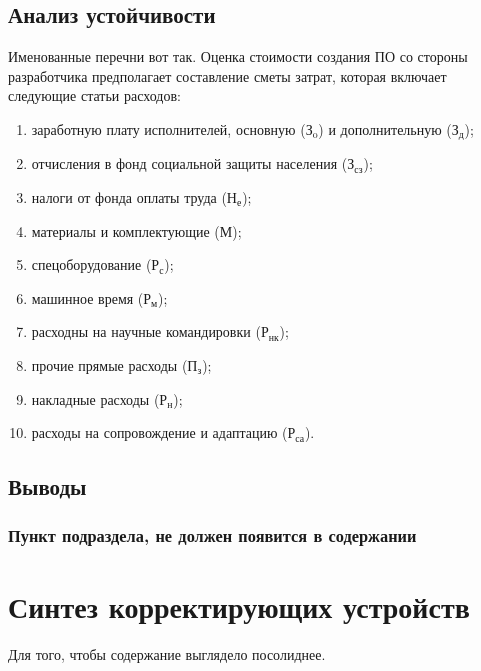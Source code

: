 \subsection{Анализ устойчивости} 
\label{sec:analysys_rob}
Именованные перечни вот так. 
Оценка стоимости создания ПО со стороны разработчика предполагает составление сметы затрат, которая включает следующие статьи расходов:
\begin{enumerate}

  \item заработную плату исполнителей, основную ($ \text{З}_{\text{o}} $) и дополнительную ($\text{З}_{\text{д}} $);

  \item отчисления в фонд социальной защиты населения ($ \text{З}_\text{сз} $);

  \item налоги от фонда оплаты труда ($ \text{Н}_\text{е} $);

  \item материалы и комплектующие ($ \text{М} $);

  \item спецоборудование ($ \text{Р}_\text{с} $);

  \item машинное время ($ \text{Р}_\text{м} $);

  \item расходны на научные командировки ($ \text{Р}_\text{нк} $);

  \item прочие прямые расходы ($ \text{П}_\text{з} $);

  \item накладные расходы ($ \text{Р}_\text{н} $);

  \item расходы на сопровождение и адаптацию ($ \text{Р}_\text{са} $).

\end{enumerate}

\subsection{Выводы} 
\label{sec:conclusion}

\subsubsection{Пункт подраздела, не должен появится в содержании}

\section{Синтез корректирующих устройств}
Для того, чтобы содержание выглядело посолиднее.

